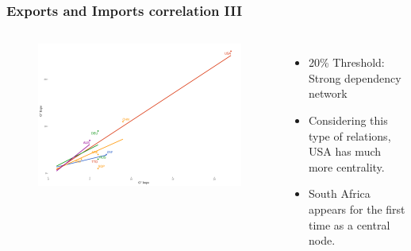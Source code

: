 \documentclass[professionalfont,fleqn]{beamer}
\begin{document}
		\begin{frame}
		
	\frametitle{Exports and Imports correlation III}
		\begin{columns}[c] %
		
	
	
	\begin{flushleft}
		\begin{figure}
			\includegraphics[width=\linewidth]{corr_grados_2011_20_pcnt}
		\end{figure}
	\end{flushleft}
	
	
	\begin{itemize}
		\item 20\% Threshold: Strong dependency network
		\item Considering this type of relations, USA has much more centrality.
		\item South Africa appears for the first time as a central node.
	\end{itemize}
		\end{columns}
	\end{frame}
	
			
	
\end{document}

